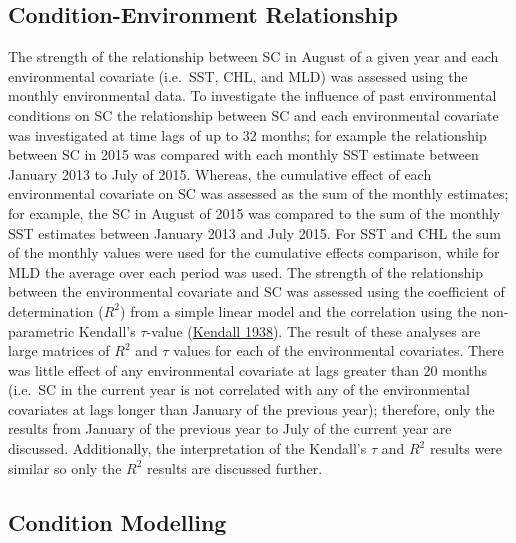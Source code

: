 \documentclass[
]{article}
\begin{document}
\hypertarget{condition-environment-relationship}{%
\subsection{Condition-Environment Relationship}\label{condition-environment-relationship}}

The strength of the relationship between SC in August of a given year and each environmental covariate (i.e.~SST, CHL, and MLD) was assessed using the monthly environmental data. To investigate the influence of past environmental conditions on SC the relationship between SC and each environmental covariate was investigated at time lags of up to 32 months; for example the relationship between SC in 2015 was compared with each monthly SST estimate between January 2013 to July of 2015. Whereas, the cumulative effect of each environmental covariate on SC was assessed as the sum of the monthly estimates; for example, the SC in August of 2015 was compared to the sum of the monthly SST estimates between January 2013 and July 2015. For SST and CHL the sum of the monthly values were used for the cumulative effects comparison, while for MLD the average over each period was used. The strength of the relationship between the environmental covariate and SC was assessed using the coefficient of determination (\(R^2\)) from a simple linear model and the correlation using the non-parametric Kendall's \(\tau\)-value (\protect\hyperlink{ref-kendallNewMeasureRank1938}{Kendall 1938}). The result of these analyses are large matrices of \(R^2\) and \(\tau\) values for each of the environmental covariates. There was little effect of any environmental covariate at lags greater than 20 months (i.e.~SC in the current year is not correlated with any of the environmental covariates at lags longer than January of the previous year); therefore, only the results from January of the previous year to July of the current year are discussed. Additionally, the interpretation of the Kendall's \(\tau\) and \(R^2\) results were similar so only the \(R^2\) results are discussed further.

\hypertarget{condition-modelling}{%
\subsection{Condition Modelling}\label{condition-modelling}}
\end{document}
